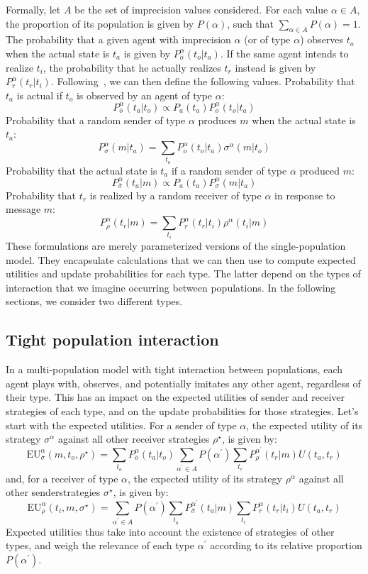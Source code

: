 \documentclass[a4paper]{article}
\begin{document}
Formally, let $A$ be the set of imprecision values considered.
For each value $\alpha \in A$, the proportion of its population is given by $P(\alpha)$, such that $\sum_{\alpha \in A} P(\alpha) = 1$.
The probability that a given agent with imprecision $\alpha$ (or of type $\alpha$) observes $t_o$ when the actual state is $t_a$ is given by $P_{o}^{\alpha}(t_{o}|t_{a})$.
If the same agent intends to realize $t_i$, the probability that he actually realizes $t_r$ instead is given by $P_{r}^{\alpha}(t_{r}|t_{i})$.
Following~\textcite[26]{franke_vagueness_2017}, we can then define the following values.
Probability that $t_a$ is actual if $t_o$ is observed by an agent of type $\alpha$:
$$
P_{\bar{o}}^{\alpha}(t_{a}|t_{o})\propto P_{a}(t_{a})P_{o}^{\alpha}(t_{o}|t_{a})
$$
Probability that a random sender of type $\alpha$ produces $m$ when the actual state is $t_a$:
$$
P_{\sigma}^{\alpha}(m|t_{a})=\sum_{t_{o}}P_{o}^{\alpha}(t_{o}|t_{a})\sigma^{\alpha}(m|t_{o})
$$
Probability that the actual state is $t_a$ if a random sender of type $\alpha$ produced $m$:
$$
P_{\bar{\sigma}}^{\alpha}(t_{a}|m)\propto P_{a}(t_{a})P_{\sigma}^{\alpha}(m|t_{a})
$$
Probability that $t_r$ is realized by a random receiver of type $\alpha$ in response to message $m$:
$$
P_{\rho}^{\alpha}(t_{r}|m)=\sum_{t_{i}}P_{r}^{\alpha}(t_{r}|t_{i})\rho^{\alpha}(t_{i}|m)
$$
These formulations are merely parameterized versions of the single-population model.
They encapsulate calculations that we can then use to compute expected utilities and update probabilities for each type.
The latter depend on the types of interaction that we imagine occurring between populations.
In the following sections, we consider two different types.

\subsection{Tight population interaction}
\label{sec:tight-interaction-model}
In a multi-population model with tight interaction between populations, each agent plays with, observes, and potentially imitates any other agent, regardless of their type.
This has an impact on the expected utilities of sender and receiver strategies of each type, and on the update probabilities for those strategies.
Let's start with the expected utilities.
For a sender of type $\alpha$, the expected utility of its strategy $\sigma^\alpha$ against all other receiver strategies $\rho^\star$, is given by:
$$
\text{EU}_{\sigma}^{\alpha}(m,t_{o},\rho^{\star})=\sum_{t_{a}}P_{\bar{o}}^{\alpha}(t_{a}|t_{o})\sum_{\alpha^{\prime}\in A}P(\alpha^{\prime})\sum_{t_{r}}P_{\rho}^{\alpha^{\prime}}(t_{r}|m)U(t_{a},t_{r})
$$
and, for a receiver of type $\alpha$, the expected utility of its strategy $\rho^\alpha$ against all other senderstrategies $\sigma^\star$, is given by:
$$
\text{EU}_{\rho}^{\alpha}(t_{i},m,\sigma^{\star})=\sum_{\alpha^{\prime}\in A}P(\alpha^{\prime})\sum_{t_{a}}P_{\bar{\sigma}}^{\alpha^{\prime}}(t_{a}|m)\sum_{t_{r}}P_{r}^{\alpha}(t_{r}|t_{i})U(t_{a},t_{r})
$$
Expected utilities thus take into account the existence of strategies of other types, and weigh the relevance of each type $\alpha^\prime$ according to its relative proportion $P(\alpha^\prime)$.
\end{document}
